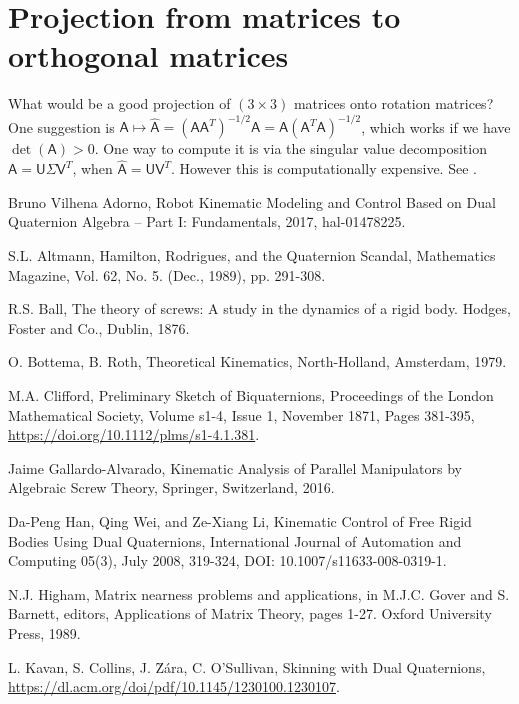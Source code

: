 \documentclass[reqno,12pt]{amsart}
\begin{document}
\section{Projection from matrices to orthogonal matrices}
\label{sec final note}

What would be a good projection of $(3 \times 3)$ matrices onto rotation matrices?  One suggestion is $\mathsf A \mapsto \widehat{\mathsf A} = (\mathsf A\mathsf A^T)^{-1/2} \mathsf A = \mathsf A (\mathsf A^T \mathsf A)^{-1/2}$, which works if we have $\det(\mathsf A) > 0$.  One way to compute it is via the singular value decomposition $\mathsf A = \mathsf U \mathsf \Sigma \mathsf V^T$, when $\widehat{\mathsf A} = \mathsf U\mathsf V^T$.  However this is computationally expensive.  See \cite{higham}.

\begin{thebibliography}{99}

 Bruno Vilhena Adorno, Robot Kinematic Modeling and Control Based on Dual Quaternion Algebra -- Part I: Fundamentals, 2017, hal-01478225.

 S.L. Altmann, Hamilton, Rodrigues, and the Quaternion Scandal, Mathematics Magazine, Vol. 62, No. 5. (Dec., 1989), pp. 291-308.

 R.S. Ball, The theory of screws: A study in the dynamics of a rigid body. Hodges, Foster and Co., Dublin, 1876.

 O. Bottema, B. Roth, Theoretical Kinematics, North-Holland, Amsterdam, 1979.

 M.A. Clifford, Preliminary Sketch of Biquaternions, Proceedings of the London Mathematical Society, Volume s1-4, Issue 1, November 1871, Pages 381-395, \url{https://doi.org/10.1112/plms/s1-4.1.381}.

 Jaime Gallardo-Alvarado, Kinematic Analysis of Parallel Manipulators by Algebraic Screw Theory, Springer, Switzerland, 2016.

 Da-Peng Han, Qing Wei, and Ze-Xiang Li, Kinematic Control of Free Rigid Bodies Using Dual Quaternions, International Journal of Automation and Computing
05(3), July 2008, 319-324, DOI: 10.1007/s11633-008-0319-1.

 N.J. Higham, Matrix nearness problems and applications, in M.J.C. Gover and S. Barnett, editors, Applications of Matrix Theory, pages 1-27. Oxford University Press, 1989.

 L. Kavan, S. Collins, J. \u Z\'ara, C. O'Sullivan, Skinning with Dual Quaternions, \url{https://dl.acm.org/doi/pdf/10.1145/1230100.1230107}.


\end{thebibliography}
\end{document}
